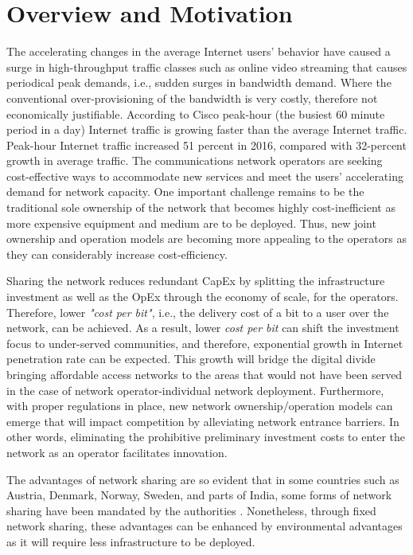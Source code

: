 \section{Overview and Motivation}
The accelerating changes in the average Internet users' behavior have caused a surge in high-throughput traffic classes such as online video streaming that causes periodical peak demands, i.e., sudden surges in bandwidth demand. Where the conventional over-provisioning of the bandwidth is very costly, therefore not economically justifiable. According to Cisco \cite{cisco_2017} peak-hour (the busiest 60 minute period in a day) Internet traffic is growing faster than the average Internet traffic. Peak-hour Internet traffic increased 51 percent in 2016, compared with 32-percent growth in average traffic. 
The communications network operators are seeking cost-effective ways to accommodate new services and meet the users' accelerating demand for network capacity. One important challenge remains to be the traditional sole ownership of the network that becomes highly cost-inefficient as more expensive equipment and medium are to be deployed. Thus, new joint ownership and operation models are becoming more appealing to the operators as they can considerably increase cost-efficiency.

Sharing the network reduces redundant \ac{CapEx} by splitting the infrastructure investment as well as the \ac{OpEx} through the economy of scale, for the operators. Therefore, lower \textit{"cost per bit"}, i.e., the delivery cost of a bit to a user over the network, can be achieved. As a result, lower \textit{cost per bit} can shift the investment focus to under-served communities, and therefore, exponential growth in Internet penetration rate can be expected. This growth will bridge the digital divide bringing affordable access networks to the areas that would not have been served in the case of network operator-individual network deployment. Furthermore, with proper regulations in place, new network ownership/operation models can emerge that will impact competition by alleviating network entrance barriers. In other words, eliminating the prohibitive preliminary investment costs to enter the network as an operator facilitates innovation.

The advantages of network sharing are so evident that in some countries such as Austria, Denmark, Norway, Sweden, and parts of India, some forms of network sharing have been mandated by the authorities \cite{nepal_sharing}. Nonetheless, through fixed network sharing, these advantages can be enhanced by environmental advantages as it will require less infrastructure to be deployed.

